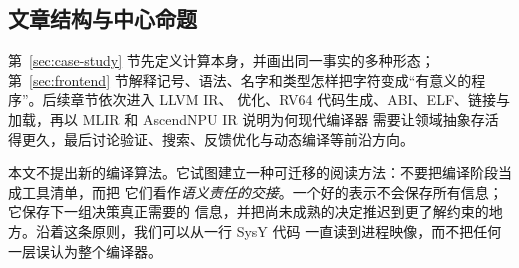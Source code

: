 \subsection{文章结构与中心命题}

第~\ref{sec:case-study} 节先定义计算本身，并画出同一事实的多种形态；第~\ref{sec:frontend}
节解释记号、语法、名字和类型怎样把字符变成“有意义的程序”。后续章节依次进入 LLVM IR、
优化、RV64 代码生成、ABI、ELF、链接与加载，再以 MLIR 和 AscendNPU IR 说明为何现代编译器
需要让领域抽象存活得更久，最后讨论验证、搜索、反馈优化与动态编译等前沿方向。

本文不提出新的编译算法。它试图建立一种可迁移的阅读方法：不要把编译阶段当成工具清单，而把
它们看作\emph{语义责任的交接}。一个好的表示不会保存所有信息；它保存下一组决策真正需要的
信息，并把尚未成熟的决定推迟到更了解约束的地方。沿着这条原则，我们可以从一行 SysY 代码
一直读到进程映像，而不把任何一层误认为整个编译器。
